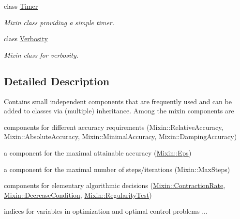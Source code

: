 \begin{DoxyCompactItemize}
class \hyperlink{classSpacy_1_1Mixin_1_1Timer}{\-Timer}
\begin{DoxyCompactList}\small\item\em \-Mixin class providing a simple timer. \end{DoxyCompactList}\item 
class \hyperlink{classSpacy_1_1Mixin_1_1Verbosity}{\-Verbosity}
\begin{DoxyCompactList}\small\item\em \-Mixin class for verbosity. \end{DoxyCompactList}\end{DoxyCompactItemize}


\subsection{\-Detailed \-Description}
\-Contains small independent components that are frequently used and can be added to classes via (multiple) inheritance. \-Among the mixin components are
\begin{DoxyItemize}
\item components for different accuracy requirements (\-Mixin\-::\-Relative\-Accuracy, \-Mixin\-::\-Absolute\-Accuracy, \-Mixin\-::\-Minimal\-Accuracy, \-Mixin\-::\-Damping\-Accuracy)
\item a component for the maximal attainable accuracy (\hyperlink{classSpacy_1_1Mixin_1_1Eps}{\-Mixin\-::\-Eps})
\item a component for the maximal number of steps/iterations (\-Mixin\-::\-Max\-Steps)
\item components for elementary algorithmic decisions (\hyperlink{classSpacy_1_1Mixin_1_1ContractionRate}{\-Mixin\-::\-Contraction\-Rate}, \hyperlink{classSpacy_1_1Mixin_1_1DecreaseCondition}{\-Mixin\-::\-Decrease\-Condition}, \hyperlink{classSpacy_1_1Mixin_1_1RegularityTest}{\-Mixin\-::\-Regularity\-Test})
\item indices for variables in optimization and optimal control problems ... 
\end{DoxyItemize}